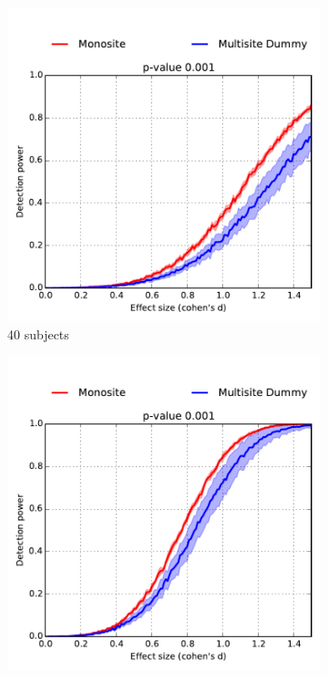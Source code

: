 \documentclass[authoryear]{elsarticle}
\begin{document}
\begin{figure}
        \centering
        \begin{subfigure}[b]{0.31\textwidth}
            \centering
            \includegraphics[width=\textwidth]{../figures/realdata_detect_pow_s40_50pct.pdf}
            {{\tiny 40 subjects}}    
            \label{fig:mean and std of net14}
        \end{subfigure}
        \hfill
        \begin{subfigure}[b]{0.31\textwidth}  
            \centering 
            \includegraphics[width=\textwidth]{../figures/realdata_detect_pow_s80_50pct.pdf}

\end{subfigure}
\end{figure}
\end{document}
